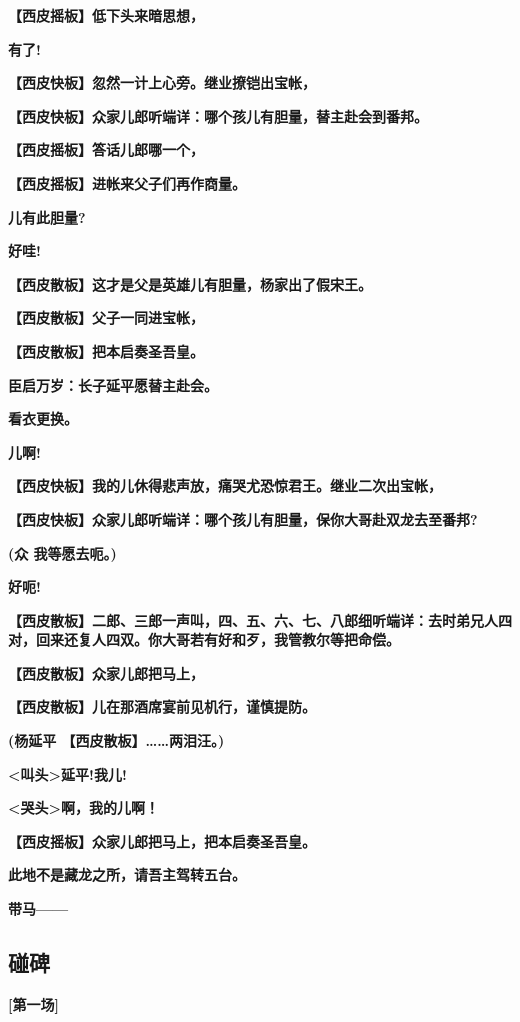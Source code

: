 \textbf{【西皮摇板】低下头来暗思想，}

\textbf{有了!}

\textbf{【西皮快板】忽然一计上心旁。继业撩铠出宝帐，}

\textbf{【西皮快板】众家儿郎听端详：哪个孩儿有胆量，替主赴会到番邦。}

\textbf{【西皮摇板】答话儿郎哪一个，}

\textbf{【西皮摇板】进帐来父子们再作商量。}

\textbf{儿有此胆量?}

\textbf{好哇!}

\textbf{【西皮散板】这才是父是英雄儿有胆量，杨家出了假宋王。}

\textbf{【西皮散板】父子一同进宝帐，}

\textbf{【西皮散板】把本启奏圣吾皇。}

\textbf{臣启万岁：长子延平愿替主赴会。}

\textbf{看衣更换。}

\textbf{儿啊!}

\textbf{【西皮快板】我的儿休得悲声放，痛哭尤恐惊君王。继业二次出宝帐，}

\textbf{【西皮快板】众家儿郎听端详：哪个孩儿有胆量，保你大哥赴双龙去至番邦?}

\textbf{(众 我等愿去呃。)}

\textbf{好呃!}

\textbf{【西皮散板】二郎、三郎一声叫，四、五、六、七、八郎细听端详：去时弟兄人四对，回来还复人四双。你大哥若有好和歹，我管教尔等把命偿。}

\textbf{【西皮散板】众家儿郎把马上，}

\textbf{【西皮散板】儿在那酒席宴前见机行，谨慎提防。}

\textbf{(杨延平 【西皮散板】\ldots{}\ldots{}两泪汪。)}

\textbf{\textless{}叫头\textgreater{}延平!我儿!}

\textbf{\textless{}哭头\textgreater{}啊，我的儿啊！}

\textbf{【西皮摇板】众家儿郎把马上，把本启奏圣吾皇。}

\textbf{此地不是藏龙之所，请吾主驾转五台。}

\textbf{带马------}

\hypertarget{ux78b0ux7891}{%
\subsection{碰碑}\label{ux78b0ux7891}}

\textbf{{[}第一场{]}}

